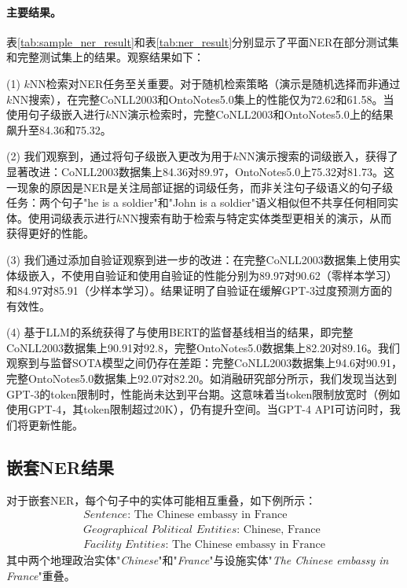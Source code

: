 \documentclass[supercite]{Experimental_Report}
\theoremstyle{definition}
\begin{document}
\paragraph{主要结果。}
\label{flat_ner_results}
表\ref{tab:sample_ner_result}和表\ref{tab:ner_result}分别显示了平面NER在部分测试集和完整测试集上的结果。观察结果如下：

(1) $k$NN检索对NER任务至关重要。对于随机检索策略（演示是随机选择而非通过$k$NN搜索），在完整CoNLL2003和OntoNotes5.0集上的性能仅为72.62和61.58。当使用句子级嵌入进行$k$NN演示检索时，完整CoNLL2003和OntoNotes5.0上的结果飙升至84.36和75.32。

(2) 我们观察到，通过将句子级嵌入更改为用于$k$NN演示搜索的词级嵌入，获得了显著改进：CoNLL2003数据集上84.36对89.97，OntoNotes5.0上75.32对81.73。这一现象的原因是NER是关注局部证据的词级任务，而非关注句子级语义的句子级任务：两个句子"he is a soldier"和"John is a soldier"语义相似但不共享任何相同实体。使用词级表示进行$k$NN搜索有助于检索与特定实体类型更相关的演示，从而获得更好的性能。

(3) 我们通过添加自验证观察到进一步的改进：在完整CoNLL2003数据集上使用实体级嵌入，不使用自验证和使用自验证的性能分别为89.97对90.62（零样本学习）和84.97对85.91（少样本学习）。结果证明了自验证在缓解GPT-3过度预测方面的有效性。

(4) 基于LLM的系统获得了与使用BERT的监督基线相当的结果，即完整CoNLL2003数据集上90.91对92.8，完整OntoNotes5.0数据集上82.20对89.16。我们观察到与监督SOTA模型之间仍存在差距：完整CoNLL2003数据集上94.6对90.91，完整OntoNotes5.0数据集上92.07对82.20。如消融研究部分所示，我们发现当达到GPT-3的token限制时，性能尚未达到平台期。这意味着当token限制放宽时（例如使用GPT-4，其token限制超过20K），仍有提升空间。当GPT-4 API可访问时，我们将更新性能。

\subsection{嵌套NER结果}

对于嵌套NER，每个句子中的实体可能相互重叠，如下例所示：
\begin{equation}
\nonumber
    \begin{aligned}
      \textit{Sentence}\text{: The Chinese embassy in France}\\
      \textit{Geographical Political Entities}\text{: Chinese, France}\\
      \textit{Facility Entities}\text{: The Chinese embassy in France}
    \end{aligned}
\end{equation}
其中两个地理政治实体"\textit{Chinese}"和"\textit{France}"与设施实体"\textit{The Chinese embassy in France}"重叠。
\end{document}
